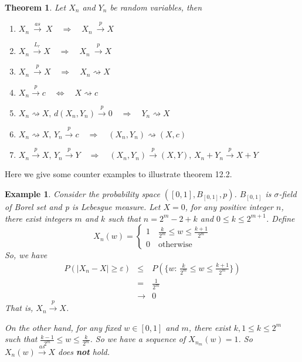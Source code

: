 \documentclass[11pt]{article}
\newtheorem{theorem}{Theorem}[section]
\newtheorem{example}{Example}[section]
\begin{document}
\begin{theorem}
Let $X_n$ and $Y_n$ be random variables, then
\begin{enumerate}
\item $X_n \ \xrightarrow{\!\!as\!\!}\ X \quad\Rightarrow\quad  X_n \ \xrightarrow{p} X$
\item $X_n \, \xrightarrow{L_r} X \quad\Rightarrow\quad  X_n \ \xrightarrow{p} X$
\item $X_n \ \xrightarrow{p} X \quad\Rightarrow\quad X_n\rightsquigarrow X$
\item $X_n \xrightarrow{p} c \quad\Leftrightarrow\quad X\rightsquigarrow c$
\item $X_n \rightsquigarrow X, \, d(X_n,Y_n) \xrightarrow{p} 0 \quad\Rightarrow\quad Y_n \rightsquigarrow X$
\item $X_n \rightsquigarrow X, \, Y_n \xrightarrow{p} c \quad\Rightarrow\quad (X_n, Y_n) \rightsquigarrow (X,c)$
\item $X_n \xrightarrow{p} X, \, Y_n \xrightarrow{p} Y \quad\Rightarrow\quad (X_n, Y_n)\xrightarrow{p} (X,Y),\, X_n+Y_n\xrightarrow{p} X+Y$
\end{enumerate}
\end{theorem}
Here we give some counter examples to illustrate theorem 12.2.
\begin{example}
Consider the probability space $([0,1], B_{[0,1]}, p)$. $B_{[0,1]}$ is $\sigma$-field of Borel set and p is Lebesgue measure. Let $X=0$, for any positive integer $n$, there exist integers $m$ and $k$ such that $n=2^m-2+k$ and $0\leq k \leq 2^{m+1}$. Define
$$
X_n(w) = \left\lbrace
\begin{array}{l}
1 \quad \frac{k}{2^m}\leq w\leq \frac{k+1}{2^m}\\
0 \quad \mbox{otherwise}
\end{array}
\right.
$$
So, we have
\begin{eqnarray*}
P(|X_n-X|\geq\varepsilon)&\leq& P(\{w:\,\frac{k}{2^m}\leq w\leq \frac{k+1}{2^m}\}) \\
&=& \frac{1}{2^m} \\
&\rightarrow& 0
\end{eqnarray*}
That is, $X_n \xrightarrow{p} X$.

On the other hand, for any fixed $w\in[0,1]$ and $m$, there exist $k, 1\leq k\leq 2^m$ such that $\frac{k-1}{2^m}\leq w\leq \frac{k}{2^m}$. So we have a sequence of $X_{n_m}(w) =1$. So $X_n(w) \xrightarrow{\!\!as\!\!} X$ does \textbf{not} hold.
\end{example}
\end{document}
